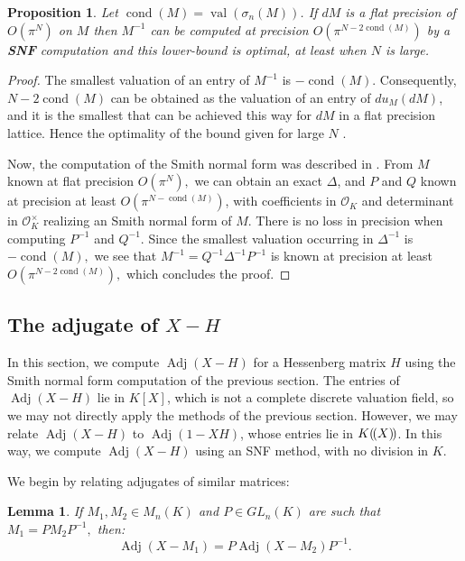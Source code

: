 \documentclass[sigconf]{acmart}
\DeclareMathOperator{\val}{val}
\DeclareMathOperator{\adj}{Adj}
\DeclareMathOperator{\cond}{cond}
\newcommand{\OK}{\mathcal{O}_K}
\newcommand{\llp}{(\mkern-2.5mu(}
\newcommand{\rrp}{)\mkern-2.5mu)}
\newtheorem{lem}[theo]{Lemma}
\newtheorem{prop}[theo]{Proposition}
\theoremstyle{definition}
\begin{document}
\begin{prop}
Let $\cond(M) = \val(\sigma_n(M))$.
If $dM$ is a flat precision of $O(\pi^N)$ on $M$ then $M^{-1}$
can be computed at precision $O(\pi^{N-2\cond(M)})$ by a \textbf{SNF} computation
and this lower-bound is optimal,
at least when $N$ is large.
\end{prop}

\begin{proof}
The smallest valuation of an entry of $M^{-1}$ is $-\cond(M)$.
Consequently, $N - 2\cond(M)$
can be obtained as the valuation of an entry of $du_M(dM)$,
and it is the smallest that can be achieved this way for $dM$ in a flat precision lattice.
Hence the optimality of the bound given for large 
$N$ \cite[Lemma 3.4]{caruso-roe-vaccon:14a}.

Now, the computation of the Smith normal form was described in \cite{Vaccon-these}.
From $M$ known at flat precision $O(\pi^N),$ we can obtain an exact $\Delta$, and $P$ and $Q$ 
known at precision at least $O(\pi^{N-\cond(M)})$, with coefficients in $\OK$
and determinant in $\OK^\times$ realizing an Smith normal form of $M.$
There is no loss in precision when computing $P^{-1}$ and $Q^{-1}.$
Since the smallest valuation occurring in $\Delta^{-1}$ is $-\cond(M),$
we see that $M^{-1}=Q^{-1} \Delta^{-1} P^{-1}$ is known at precision at least $O(\pi^{N-2\cond(M)}),$
which concludes the proof.
\end{proof}

\subsection{The adjugate of \texorpdfstring{$X{-}H$}{X-H}}

In this section, we compute $\adj(X-H)$ for a Hessenberg matrix $H$
using the Smith normal form computation of the previous section.
The entries of $\adj(X-H)$ lie in $K[X]$, which is not a complete
discrete valuation field,
so we may not directly apply the methods of the previous section.
However, we may relate $\adj(X-H)$ to $\adj(1-XH)$, whose
entries lie in $K\llp X\rrp$.  In this way, we compute $\adj(X-H)$
using an SNF method, with no division in $K$.

We begin by relating adjugates of
similar matrices:

\begin{lem} \label{lem:adjugate_of_similar}
If $M_1,M_2 \in M_n(K)$ and $P \in GL_n (K)$ are such that
$M_1=PM_2P^{-1},$ then:
\[ \adj (X-M_1)=P \adj (X-M_2) P^{-1}. \] 
\end{lem}
\end{document}
